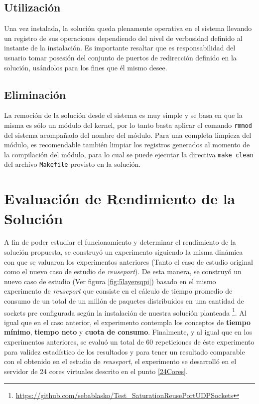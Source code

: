 \subsection{Utilización}
Una vez instalada, la solución queda plenamente operativa en el sistema llevando un registro de sus operaciones dependiendo del nivel de verbosidad definido al instante de la instalación. Es importante resaltar que es responsabilidad del usuario tomar posesión del conjunto de puertos de redirección definido en la solución, usándolos para los fines que él mismo desee.

\subsection{Eliminación}
La remoción de la solución desde el sistema es muy simple y se basa en que la misma es sólo un módulo del kernel, por lo tanto basta aplicar el comando \verb=rmmod= del sistema acompañado del nombre del módulo. Para una completa limpieza del módulo, es recomendable también limpiar los registros generados al momento de la compilación del módulo, para lo cual se puede ejecutar la directiva \verb=make clean= del archivo \verb=Makefile= provisto en la solución.

\section{Evaluación de Rendimiento de la Solución}

A fin de poder estudiar el funcionamiento y determinar el rendimiento de la solución propuesta, se construyó un experimento siguiendo la misma dinámica con que se valuaron los experimentos anteriores (Tanto el caso de estudio original como el nuevo caso de estudio de \emph{reuseport}). De esta manera, se construyó un nuevo caso de estudio (Ver figura \ref{fig:5layersqpi}) basado en el mismo experimento de \emph{reuseport} que consiste en el cálculo de tiempo promedio de consumo de un total de un millón de paquetes distribuidos en una cantidad de sockets pre configurada según la instalación de nuestra solución planteada \footnote{\url{ https://github.com/sebablasko/Test_SaturationReusePortUDPSockets}}. Al igual que en el caso anterior, el experimento contempla los conceptos de \textbf{tiempo mínimo}, \textbf{tiempo neto} y \textbf{cuota de consumo}. Finalmente, y al igual que en los experimentos anteriores, se evaluó un total de 60 repeticiones de éste experimento para validez estadístico de los resultados y para tener un resultado comparable con el obtenido en el estudio de \emph{reuseport}, el experimento se desarrolló en el servidor de 24 cores virtuales descrito en el punto \ref{24Cores}.

